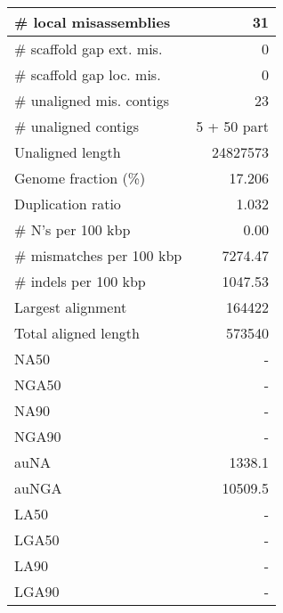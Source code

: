 \documentclass[12pt,a4paper]{article}
\begin{document}
\begin{table}[ht]
\begin{center}
\begin{tabular}{|l*{1}{|r}|}
\# local misassemblies & 31 \\ \hline
\# scaffold gap ext. mis. & 0 \\ \hline
\# scaffold gap loc. mis. & 0 \\ \hline
\# unaligned mis. contigs & 23 \\ \hline
\# unaligned contigs & 5 + 50 part \\ \hline
Unaligned length & 24827573 \\ \hline
Genome fraction (\%) & 17.206 \\ \hline
Duplication ratio & 1.032 \\ \hline
\# N's per 100 kbp & 0.00 \\ \hline
\# mismatches per 100 kbp & 7274.47 \\ \hline
\# indels per 100 kbp & 1047.53 \\ \hline
Largest alignment & 164422 \\ \hline
Total aligned length & 573540 \\ \hline
NA50 & - \\ \hline
NGA50 & - \\ \hline
NA90 & - \\ \hline
NGA90 & - \\ \hline
auNA & 1338.1 \\ \hline
auNGA & 10509.5 \\ \hline
LA50 & - \\ \hline
LGA50 & - \\ \hline
LA90 & - \\ \hline
LGA90 & - \\ \hline
\end{tabular}
\end{center}
\end{table}
\end{document}
